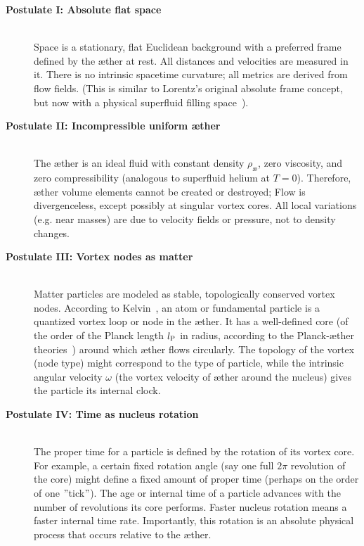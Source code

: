 \begin{description}
    \item[\textbf{Postulate I: Absolute flat space}] \hfill \\
    Space is a stationary, flat Euclidean background with a preferred frame defined by the æther at rest. All distances and velocities are measured in it. There is no intrinsic spacetime curvature; all metrics are derived from flow fields. (This is similar to Lorentz's original absolute frame concept, but now with a physical superfluid filling space~\cite{Winterberg2002-PlanckÆther}).

    \item[\textbf{Postulate II: Incompressible uniform æther}] \hfill \\
    The æther is an ideal fluid with constant density $\rho_\text{\ae}$, zero viscosity, and zero compressibility (analogous to superfluid helium at $T=0$). Therefore, æther volume elements cannot be created or destroyed; Flow is divergenceless, except possibly at singular vortex cores. All local variations (e.g. near masses) are due to velocity fields or pressure, not to density changes.

    \item[\textbf{Postulate III: Vortex nodes as matter}] \hfill \\
    Matter particles are modeled as stable, topologically conserved vortex nodes. According to Kelvin~\cite{Kelvin1867-vortex}, an atom or fundamental particle is a quantized vortex loop or node in the æther. It has a well-defined core (of the order of the Planck length $l_{\textrm P}$ in radius, according to the Planck-æther theories~\cite{Winterberg2002-PlanckÆther}) around which æther flows circularly. The topology of the vortex (node type) might correspond to the type of particle, while the intrinsic angular velocity $\omega$ (the vortex velocity of æther around the nucleus) gives the particle its internal clock.

    \item[\textbf{Postulate IV: Time as nucleus rotation}] \hfill \\
    The proper time for a particle is defined by the rotation of its vortex core. For example, a certain fixed rotation angle (say one full $2\pi$ revolution of the core) might define a fixed amount of proper time (perhaps on the order of one \("\)tick\("\)). The age or internal time of a particle advances with the number of revolutions its core performs. Faster nucleus rotation means a faster internal time rate. Importantly, this rotation is an absolute physical process that occurs relative to the æther.


\end{description}
